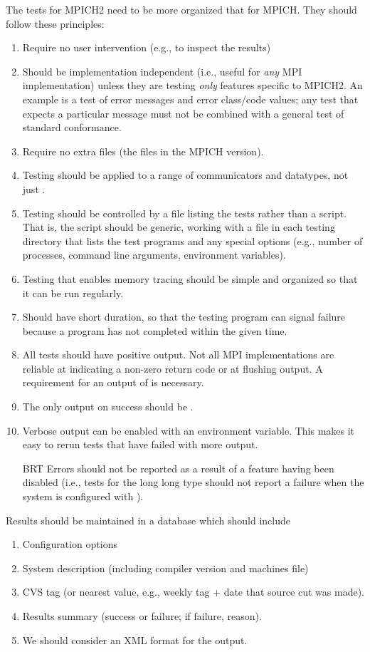 \documentclass{article}
\begin{document}
The tests for MPICH2 need to be more organized that for MPICH. They
should follow these principles:
\begin{enumerate}
\item Require no user intervention (e.g., to inspect the results)
\item Should be implementation independent (i.e., useful for
\emph{any} MPI implementation) unless they are testing \emph{only}
features specific to MPICH2.  An example is a test of error messages
and error class/code values; any test that expects a particular
message must not be combined with a general test of standard
conformance.
\item Require no extra files (the  files in the MPICH
version).
\item Testing should be applied to a range of communicators and
datatypes, not just .  
\item Testing should be controlled by a file listing the tests rather
than a script.  That is, the script  should be generic,
working with a file in each testing directory that lists the test
programs and any special options (e.g., number of processes, command
line arguments, environment variables).
\item Testing that enables memory tracing should be simple and
organized so that it can be run regularly.
\item Should have short duration, so that the testing program can
signal failure because a program has not completed within the given
time.
\item All tests should have positive output.  Not all MPI
implementations are reliable at indicating a non-zero return code or at
flushing output.  A requirement for an output of  is
necessary. 
\item The only output on success should be .
\item Verbose output can be enabled with an environment variable.  This makes
  it easy to rerun tests that have failed with more output.
\item [BRT] Errors should not be reported as a result of a feature
having been disabled (i.e., tests for the long long type should not
report a failure when the system is configured with
).
\end{enumerate}

Results should be maintained in a database which should include
\begin{enumerate}
\item Configuration options
\item System description (including compiler version and machines file)
\item CVS tag (or nearest value, e.g., weekly tag + date that source
cut was made).
\item Results summary (success or failure; if failure, reason).
\item We should consider an XML format for the output.
\end{enumerate}
\end{document}
